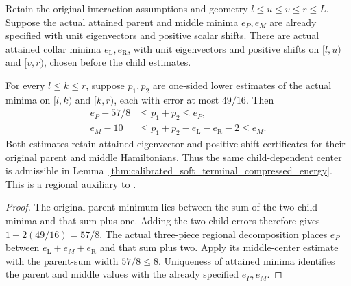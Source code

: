 \begin{lemma}
    \label{thm:regional_middle_center_from_children}
    \leanok
    Retain the original interaction assumptions and geometry
    $l\le u\le v\le r\le L$. Suppose the actual attained parent and
    middle minima $e_P,e_M$ are already specified with unit eigenvectors
    and positive scalar shifts. There are actual attained collar minima
    $e_{\mathrm L},e_{\mathrm R}$, with unit eigenvectors and positive
    shifts on $[l,u)$ and $[v,r)$, chosen before the child estimates.

    For every $l\le k\le r$, suppose $p_1,p_2$ are one-sided lower
    estimates of the actual minima on $[l,k)$ and $[k,r)$, each with
    error at most $49/16$. Then
    \begin{align}
        e_P-57/8 & \le p_1+p_2\le e_P,                               \\
        e_M-10   & \le p_1+p_2-e_{\mathrm L}-e_{\mathrm R}-2\le e_M.
    \end{align}
    Both estimates retain attained eigenvector and positive-shift
    certificates for their original parent and middle Hamiltonians.
    Thus the same child-dependent center is admissible in
    Lemma~\ref{thm:calibrated_soft_terminal_compressed_energy}.
    This is a regional auxiliary to
    \cite[Figure~\texttt{fig:algo1}, line 1631, and line 1807]{Arad2016RigorousRG}.
\end{lemma}
\begin{proof}\leanok
    The original parent minimum lies between the sum of the two child
    minima and that sum plus one. Adding the two child errors therefore
    gives $1+2(49/16)=57/8$. The actual three-piece regional decomposition
    places $e_P$ between
    $e_{\mathrm L}+e_M+e_{\mathrm R}$ and that sum plus two.
    Apply its middle-center estimate with the parent-sum width
    $57/8\le8$. Uniqueness of attained minima identifies the parent and
    middle values with the already specified $e_P,e_M$.
\end{proof}

